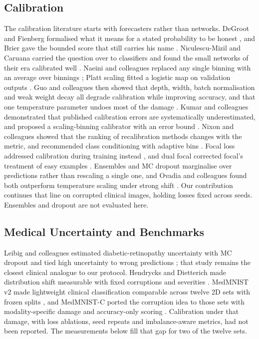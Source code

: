 \documentclass[a4paper,11pt,en,citestyle=authoryear,bibstyle=authoryear]{elegantpaper}
\begin{document}
\subsection{Calibration}
The calibration literature starts with forecasters rather than networks. DeGroot and Fienberg formalised what it means for a stated probability to be honest \parencite{degroot1983}, and Brier gave the bounded score that still carries his name \parencite{brier1950}. Niculescu-Mizil and Caruana carried the question over to classifiers and found the small networks of their era calibrated well \parencite{nmic2005}. Naeini and colleagues replaced any single binning with an average over binnings \parencite{naeini2015}; Platt scaling fitted a logistic map on validation outputs \parencite{platt1999}. Guo and colleagues then showed that depth, width, batch normalisation and weak weight decay all degrade calibration while improving accuracy, and that one temperature parameter undoes most of the damage \parencite{guo2017}. Kumar and colleagues demonstrated that published calibration errors are systematically underestimated, and proposed a scaling-binning calibrator with an error bound \parencite{kumar2019}. Nixon and colleagues showed that the ranking of recalibration methods changes with the metric, and recommended class conditioning with adaptive bins \parencite{nixon2019}. Focal loss addressed calibration during training instead \parencite{focal2020}, and dual focal corrected focal's treatment of easy examples \parencite{dualfocal2023}. Ensembles \parencite{lakshminarayanan2017} and MC dropout \parencite{gal2016} marginalise over predictions rather than rescaling a single one, and Ovadia and colleagues found both outperform temperature scaling under strong shift \parencite{ovadia2019}. Our contribution continues that line on corrupted clinical images, holding losses fixed across seeds. Ensembles and dropout are not evaluated here.
\subsection{Medical Uncertainty and Benchmarks}
Leibig and colleagues estimated diabetic-retinopathy uncertainty with MC dropout and tied high uncertainty to wrong predictions \parencite{leibig2017}; that study remains the closest clinical analogue to our protocol. Hendrycks and Dietterich made distribution shift measurable with fixed corruptions and severities \parencite{corrupt2019}. MedMNIST v2 made lightweight clinical classification comparable across twelve 2D sets with frozen splits \parencite{medmnist2023}, and MedMNIST-C ported the corruption idea to those sets with modality-specific damage and accuracy-only scoring \parencite{medmnistc2024}. Calibration under that damage, with loss ablations, seed repeats and imbalance-aware metrics, had not been reported. The measurements below fill that gap for two of the twelve sets.
\end{document}
